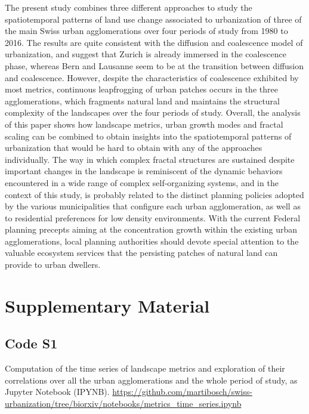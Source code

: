 The present study combines three different approaches to study the spatiotemporal patterns of land use change associated to urbanization of three of the main Swiss urban agglomerations over four periods of study from 1980 to 2016.
The results are quite consistent with the diffusion and coalescence model of urbanization, and suggest that Zurich is already immersed in the coalescence phase, whereas Bern and Lausanne seem to be at the transition between diffusion and coalescence.
However, despite the characteristics of coalescence exhibited by most metrics, continuous leapfrogging of urban patches occurs in the three agglomerations, which fragments natural land and maintains the structural complexity of the landscapes over the four periods of study.
Overall, the analysis of this paper shows how landscape metrics, urban growth modes and fractal scaling can be combined to obtain insights into the spatiotemporal patterns of urbanization that would be hard to obtain with any of the approaches individually. 
The way in which complex fractal structures are sustained despite important changes in the landscape is reminiscent of the dynamic behaviors encountered in a wide range of complex self-organizing systems, and in the context of this study, is probably related to the distinct planning policies adopted by the various municipalities that configure each urban agglomeration, as well as to residential preferences for low density environments.
With the current Federal planning precepts aiming at the concentration growth within the existing urban agglomerations, local planning authorities should devote special attention to the valuable ecosystem services that the persisting patches of natural land can provide to urban dwellers.



\section*{Supplementary Material}

\setcounter{figure}{0}
\renewcommand{\thefigure}{S\arabic{figure}}

\subsection*{Code S1}
\label{code-metrics-time-series}
Computation of the time series of landscape metrics and exploration of their correlations over all the urban agglomerations and the whole period of study, as Jupyter Notebook (IPYNB).
\url{https://github.com/martibosch/swiss-urbanization/tree/biorxiv/notebooks/metrics_time_series.ipynb}


